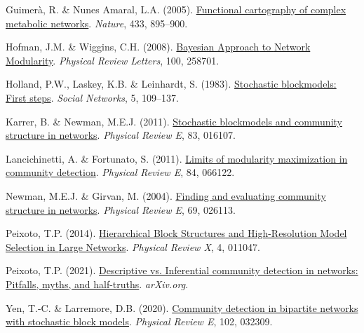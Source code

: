 \documentclass[
]{article}
\newlength{\cslhangindent}
\newlength{\cslentryspacingunit} %
\newenvironment{CSLReferences}[2] %
 {%
  \setlength{\parindent}{0pt}
  \ifodd #1
  \let\oldpar\par
  \def\par{\hangindent=\cslhangindent\oldpar}
  \fi
  \setlength{\parskip}{#2\cslentryspacingunit}
 }%
 {}
\begin{document}
\begin{CSLReferences}{1}{0}
\leavevmode{}%
Guimerà, R. \& Nunes Amaral, L.A. (2005).
\href{https://doi.org/10.1038/nature03288}{Functional cartography of
complex metabolic networks}. \emph{Nature}, 433, 895--900.

\leavevmode{}%
Hofman, J.M. \& Wiggins, C.H. (2008).
\href{https://doi.org/10.1103/PhysRevLett.100.258701}{Bayesian
{Approach} to {Network Modularity}}. \emph{Physical Review Letters},
100, 258701.

\leavevmode{}%
Holland, P.W., Laskey, K.B. \& Leinhardt, S. (1983).
\href{https://doi.org/10.1016/0378-8733(83)90021-7}{Stochastic
blockmodels: {First} steps}. \emph{Social Networks}, 5, 109--137.

\leavevmode{}%
Karrer, B. \& Newman, M.E.J. (2011).
\href{https://doi.org/10.1103/PhysRevE.83.016107}{Stochastic blockmodels
and community structure in networks}. \emph{Physical Review E}, 83,
016107.

\leavevmode{}%
Lancichinetti, A. \& Fortunato, S. (2011).
\href{https://doi.org/10.1103/PhysRevE.84.066122}{Limits of modularity
maximization in community detection}. \emph{Physical Review E}, 84,
066122.

\leavevmode{}%
Newman, M.E.J. \& Girvan, M. (2004).
\href{https://doi.org/10.1103/PhysRevE.69.026113}{Finding and evaluating
community structure in networks}. \emph{Physical Review E}, 69, 026113.

\leavevmode{}%
Peixoto, T.P. (2014).
\href{https://doi.org/10.1103/PhysRevX.4.011047}{Hierarchical {Block
Structures} and {High-Resolution Model Selection} in {Large Networks}}.
\emph{Physical Review X}, 4, 011047.

\leavevmode{}%
Peixoto, T.P. (2021).
\href{https://doi.org/10.1017/9781009118897}{Descriptive vs. Inferential
community detection in networks: Pitfalls, myths, and half-truths}.
\emph{arXiv.org}.

\leavevmode{}%
Yen, T.-C. \& Larremore, D.B. (2020).
\href{https://doi.org/10.1103/PhysRevE.102.032309}{Community detection
in bipartite networks with stochastic block models}. \emph{Physical
Review E}, 102, 032309.

\end{CSLReferences}
\end{document}
